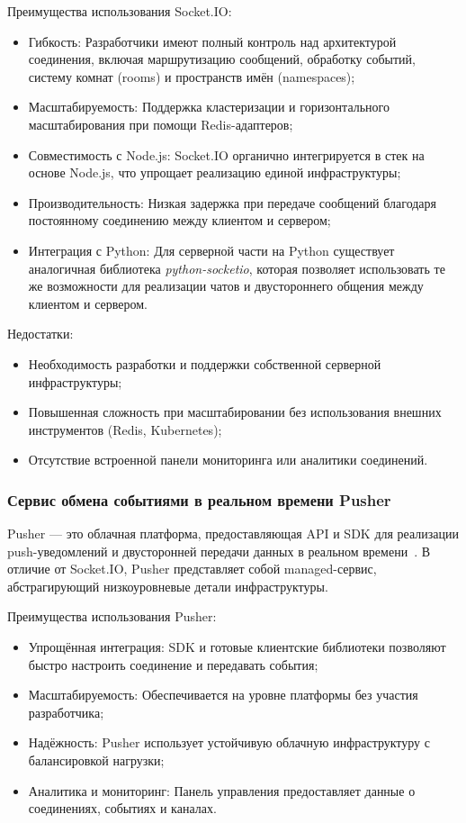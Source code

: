 Преимущества использования Socket.IO:
\begin{itemize}
  \item Гибкость: Разработчики имеют полный контроль над архитектурой соединения, включая маршрутизацию сообщений, обработку событий, систему комнат (rooms) и пространств имён (namespaces);
  \item Масштабируемость: Поддержка кластеризации и горизонтального масштабирования при помощи Redis-адаптеров;
  \item Совместимость с Node.js: Socket.IO органично интегрируется в стек на основе Node.js, что упрощает реализацию единой инфраструктуры;
  \item Производительность: Низкая задержка при передаче сообщений благодаря постоянному соединению между клиентом и сервером;
  \item Интеграция с Python: Для серверной части на Python существует аналогичная библиотека \textit{python-socketio}, которая позволяет использовать те же возможности для реализации чатов и двустороннего общения между клиентом и сервером.
\end{itemize}

Недостатки:
\begin{itemize}
  \item Необходимость разработки и поддержки собственной серверной инфраструктуры;
  \item Повышенная сложность при масштабировании без использования внешних инструментов (Redis, Kubernetes);
  \item Отсутствие встроенной панели мониторинга или аналитики соединений.
\end{itemize}

\subsubsection*{Сервис обмена событиями в реальном времени Pusher}

Pusher — это облачная платформа, предоставляющая API и SDK для реализации push-уведомлений и двусторонней передачи данных в реальном времени~\cite{pusher_docs}. В отличие от Socket.IO, Pusher представляет собой managed-сервис, абстрагирующий низкоуровневые детали инфраструктуры.

Преимущества использования Pusher:
\begin{itemize}
  \item Упрощённая интеграция: SDK и готовые клиентские библиотеки позволяют быстро настроить соединение и передавать события;
  \item Масштабируемость: Обеспечивается на уровне платформы без участия разработчика;
  \item Надёжность: Pusher использует устойчивую облачную инфраструктуру с балансировкой нагрузки;
  \item Аналитика и мониторинг: Панель управления предоставляет данные о соединениях, событиях и каналах.
\end{itemize}

